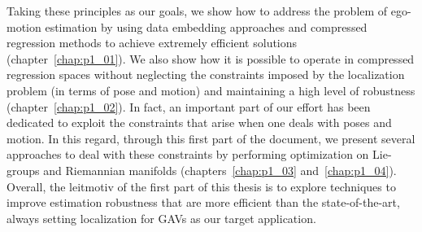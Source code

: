 Taking these principles as our goals, we show how to address the problem of ego-motion estimation by using data embedding approaches and compressed regression methods to achieve extremely efficient solutions (chapter~\ref{chap:p1_01}). We also show how it is possible to operate in compressed regression spaces without neglecting the constraints imposed  by the localization problem (in terms of pose and motion) and maintaining a high level of robustness (chapter~\ref{chap:p1_02}). In fact, an important part of our effort has been dedicated to exploit the constraints that arise when one deals with poses and motion. In this regard, through this first part of the document, we present several approaches to deal with these constraints by performing optimization on Lie-groups and Riemannian manifolds (chapters~\ref{chap:p1_03} and~\ref{chap:p1_04}). Overall, the leitmotiv of the first part of this thesis is to explore techniques to improve estimation robustness that are more efficient than the state-of-the-art, always setting localization for GAVs as our target application.
